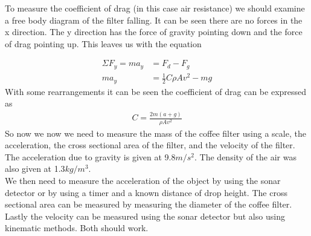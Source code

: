 \documentclass{article}
\begin{document}
    To measure the coefficient of drag (in this case air resistance) we should examine a free body diagram of the filter falling. It can be seen there are no forces in the x direction. The y direction has the force of gravity pointing down and the force of drag pointing up. This leaves us with the equation

    \begin{align*}
        \Sigma{}F_y = ma_y &= F_d - F_g\\
        ma_y &= \frac{1}{2}C\rho{}Av^2 - mg
    \end{align*}
    With some rearrangements it can be seen the coefficient of drag can be expressed as
    \begin{align*}
        C = \frac{2m(a+g)}{\rho{}Av^2}
    \end{align*}
    So now we now we need to measure the mass of the coffee filter using a scale, the acceleration, the cross sectional area of the filter, and the velocity of the filter. The acceleration due to gravity is given at 9.8$m/s^2$. The density of the air was also given at 1.3$kg/m^3$.\\

    We then need to measure the acceleration of the object by using the sonar detector or by using a timer and a known distance of drop height. The cross sectional area can be measured by measuring the diameter of the coffee filter. Lastly the velocity can be measured using the sonar detector but also using kinematic methods. Both should work.
\end{document}
